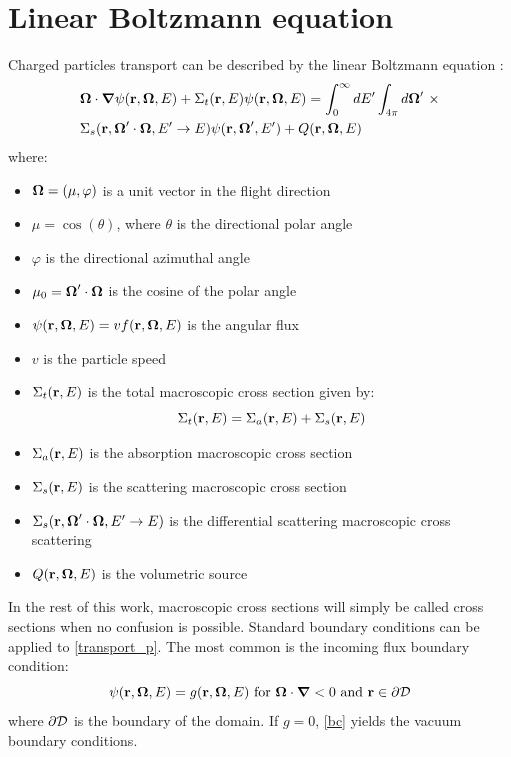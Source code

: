 \section{Linear Boltzmann equation}
Charged particles transport can be described by the linear Boltzmann equation 
\cite{cepxs,galerkin_morel,morel_81}:
\begin{equation}
  \begin{split}
    & \bo\cdot \bn \psi(\br,\bo,E) + \Sigma_t(\br,E)\psi(\br,\bo,E) = 
    \int_0^{\infty}dE'\int_{4\pi}d\bo'\ \times\\
    &\Sigma_s(\br,\bo'\cdot\bo,E'\rightarrow E) \psi(\br,\bo',E')+Q(\br,\bo,E)
  \end{split}
\label{transport_p}
\end{equation}
where:
\begin{itemize}
\item $\boldsymbol{\Omega} = (\mu,\varphi)$ is a unit vector in the flight direction
\item $\mu = \cos(\theta)$, where $\theta$ is the directional polar angle
\item $\varphi$ is the directional azimuthal angle
\item $\mu_0 = \boldsymbol{\Omega}'\cdot \boldsymbol{\Omega}$ is the cosine of the polar angle
\item $\psi(\mathbf{r},\boldsymbol{\Omega},E) = vf(\mathbf{r},\boldsymbol{\Omega},E)$ is the angular flux
\item $v$ is the particle speed
\item $\Sigma_t(\mathbf{r},E)$ is the total macroscopic cross section given by:
\begin{equation}
\Sigma_t(\mathbf{r},E) = \Sigma_a(\mathbf{r},E)+\Sigma_s(\mathbf{r},E)
\end{equation}
\item $\Sigma_a(\mathbf{r},E)$ is the absorption macroscopic cross section
\item $\Sigma_s(\mathbf{r},E)$ is the scattering macroscopic cross section
\item $\Sigma_s(\mathbf{r},\boldsymbol{\Omega}'\cdot \boldsymbol{\Omega}, E'\rightarrow E)$ is the differential
scattering macroscopic cross scattering
\item $Q(\mathbf{r},\boldsymbol{\Omega},E)$ is the volumetric source
\end{itemize}
In the rest of this work, macroscopic cross sections will simply be called cross
sections when no confusion is possible. Standard boundary conditions can be
applied to \cref{transport_p}. The most common is the incoming flux boundary
condition:
\begin{equation}
\psi (\br,\bo,E) = g(\br,\bo,E) \textrm{ for }\bo \cdot \bn <0 \textrm{ and }
\br \in \partial \mc{D}
\label{bc}
\end{equation}
where $\partial \mathcal{D}$ is the boundary of the domain. If $g=0$, \cref{bc} yields 
the vacuum boundary conditions.

